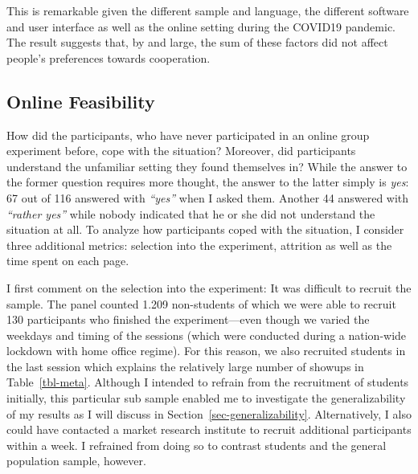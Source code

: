 \documentclass[
  authoryear,
  preprint,
  3p]{elsarticle}
\begin{document}
This is remarkable given the different sample and language, the
different software and user interface as well as the online setting
during the COVID19 pandemic. The result suggests that, by and large, the
sum of these factors did not affect people's preferences towards
cooperation.

\hypertarget{sec-feasibility}{%
\subsection{Online Feasibility}\label{sec-feasibility}}

How did the participants, who have never participated in an online group
experiment before, cope with the situation? Moreover, did participants
understand the unfamiliar setting they found themselves in? While the
answer to the former question requires more thought, the answer to the
latter simply is \emph{yes}: 67 out of 116 answered with \emph{``yes''}
when I asked them. Another 44 answered with \emph{``rather yes''} while
nobody indicated that he or she did not understand the situation at all.
To analyze how participants coped with the situation, I consider three
additional metrics: selection into the experiment, attrition as well as
the time spent on each page.

I first comment on the selection into the experiment: It was difficult
to recruit the sample. The panel counted 1.209 non-students of which we
were able to recruit 130 participants who finished the experiment---even
though we varied the weekdays and timing of the sessions (which were
conducted during a nation-wide lockdown with home office regime). For
this reason, we also recruited students in the last session which
explains the relatively large number of showups in Table~\ref{tbl-meta}.
Although I intended to refrain from the recruitment of students
initially, this particular sub sample enabled me to investigate the
generalizability of my results as I will discuss in
Section~\ref{sec-generalizability}. Alternatively, I also could have
contacted a market research institute to recruit additional participants
within a week. I refrained from doing so to contrast students and the
general population sample, however.
\end{document}
